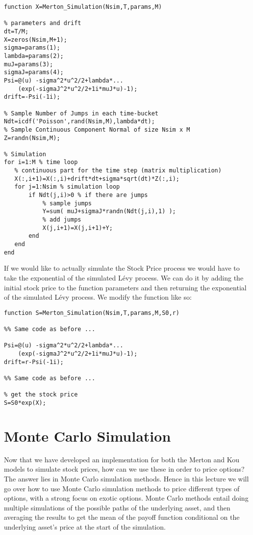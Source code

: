 \begin{verbatim}
function X=Merton_Simulation(Nsim,T,params,M)

% parameters and drift
dt=T/M;
X=zeros(Nsim,M+1);
sigma=params(1);
lambda=params(2);
muJ=params(3);
sigmaJ=params(4);
Psi=@(u) -sigma^2*u^2/2+lambda*...
    (exp(-sigmaJ^2*u^2/2+1i*muJ*u)-1);
drift=-Psi(-1i);

% Sample Number of Jumps in each time-bucket
Ndt=icdf('Poisson',rand(Nsim,M),lambda*dt);
% Sample Continuous Component Normal of size Nsim x M
Z=randn(Nsim,M);

% Simulation
for i=1:M % time loop
   % continuous part for the time step (matrix multiplication)
   X(:,i+1)=X(:,i)+drift*dt+sigma*sqrt(dt)*Z(:,i);
   for j=1:Nsim % simulation loop
       if Ndt(j,i)>0 % if there are jumps
           % sample jumps
           Y=sum( muJ+sigmaJ*randn(Ndt(j,i),1) );
           % add jumps
           X(j,i+1)=X(j,i+1)+Y;
       end
   end
end
\end{verbatim}

If we would like to actually simulate the Stock Price process we would have to
take the exponential of the simulated L\'evy process. We can do it by adding the
initial stock price to the function parameters and then returning the
exponential of the simulated L\'evy process. We modify the function like so:

\begin{verbatim}
function S=Merton_Simulation(Nsim,T,params,M,S0,r)

%% Same code as before ... 

Psi=@(u) -sigma^2*u^2/2+lambda*...
    (exp(-sigmaJ^2*u^2/2+1i*muJ*u)-1);
drift=r-Psi(-1i);

%% Same code as before ...

% get the stock price
S=S0*exp(X);

\end{verbatim}


\section{Monte Carlo Simulation}

Now that we have developed an implementation for both the Merton and Kou models
to simulate stock prices, how can we use these in order to price options? The
answer lies in Monte Carlo simulation methods. Hence in this lecture we will go
over how to use Monte Carlo simulation methods to price different types of
options, with a strong focus on exotic options. Monte Carlo methods entail doing
multiple simulations of the possible paths of the underlying asset, and then
averaging the results to get the mean of the payoff function conditional on the
underlying asset's price at the start of the simulation.

